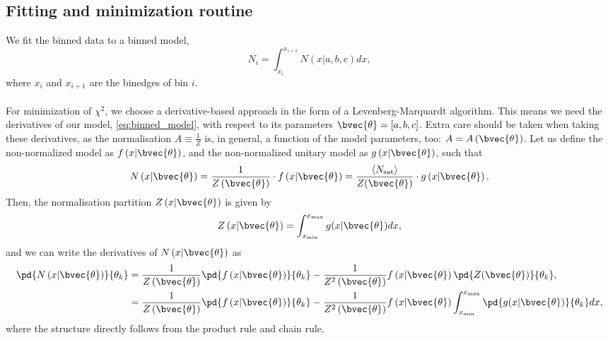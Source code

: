 \subsection{Fitting and minimization routine}
We fit the binned data to a binned model,
\begin{equation}
    N_i = \int_{x_i}^{x_{i+1}} N(x| a, b, c) dx,
    \label{eq:binned_model}
\end{equation}
where $x_i$ and $x_{i+1}$ are the binedges of bin $i$. \\
\\
For minimization of $\chi^2$, we choose a derivative-based approach in the form of a Levenberg-Marquardt algorithm. This means we need the derivatives of our model, \eqref{eq:binned_model}, with respect to its parameters $\bvec{\theta} = [a, b, c]$. Extra care should be taken when taking these derivatives, as the normalisation $A\equiv\frac{1}{Z}$ is, in general, a function of the model parameters, too: $A = A\left(\bvec{\theta}\right)$. Let us define the non-normalized model as $f\left(x| \bvec{\theta}\right)$, and the non-normalized unitary model as $g\left(x|\bvec{\theta}\right)$, such that
\begin{equation}
    N\left(x| \bvec{\theta}\right) = \frac{1}{Z\left(\bvec{\theta}\right)}\cdot f\left(x| \bvec{\theta}\right) = \frac{\langle N_\text{sat}\rangle}{Z(\bvec{\theta})}\cdot g\left(x|\bvec{\theta}\right).
    \label{eq:unnorm_definition}
\end{equation}
Then, the normalisation partition $Z\left(x|\bvec{\theta}\right)$ is given by
\begin{equation}
    Z\left(x|\bvec{\theta}\right) = \int_{x_\text{min}}^{x_\text{max}}g(x|\bvec{\theta})dx,
\end{equation}
and we can write the derivatives of $N\left(x|\bvec{\theta}\right)$ as
\begin{align}
    \pd{N\left(x|\bvec{\theta}\right)}{\theta_k} &= \frac{1}{Z\left(\bvec{\theta}\right)} \pd{f\left(x|\bvec{\theta}\right)}{\theta_k} - \frac{1}{Z^2\left(\bvec{\theta}\right)}f\left(x|\bvec{\theta}\right)\pd{Z(\bvec{\theta})}{\theta_k},\\
    &= \frac{1}{Z\left(\bvec{\theta}\right)} \pd{f\left(x|\bvec{\theta}\right)}{\theta_k} - \frac{1}{Z^2\left(\bvec{\theta}\right)}f\left(x|\bvec{\theta}\right)\int_{x_\text{min}}^{x_\text{max}}\pd{g(x|\bvec{\theta})}{\theta_k}dx,
\end{align}
where the structure directly follows from the product rule and chain rule.\\
